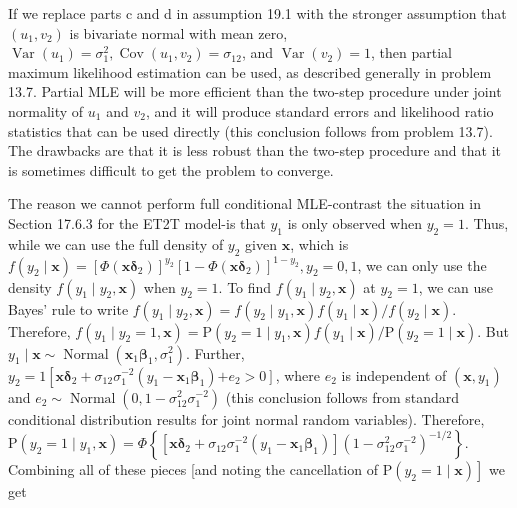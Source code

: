 \documentclass[10pt]{article}
\begin{document}
If we replace parts c and d in assumption 19.1 with the stronger assumption that $\left(u_{1}, v_{2}\right)$ is bivariate normal with mean zero, $\operatorname{Var}\left(u_{1}\right)=\sigma_{1}^{2}, \operatorname{Cov}\left(u_{1}, v_{2}\right)=\sigma_{12}$, and $\operatorname{Var}\left(v_{2}\right)=1$, then partial maximum likelihood estimation can be used, as described generally in problem 13.7. Partial MLE will be more efficient than the two-step procedure under joint normality of $u_{1}$ and $v_{2}$, and it will produce standard errors and likelihood ratio statistics that can be used directly (this conclusion follows from problem 13.7). The drawbacks are that it is less robust than the two-step procedure and that it is sometimes difficult to get the problem to converge.

The reason we cannot perform full conditional MLE-contrast the situation in Section 17.6.3 for the ET2T model-is that $y_{1}$ is only observed when $y_{2}=1$. Thus, while we can use the full density of $y_{2}$ given $\mathbf{x}$, which is $f\left(y_{2} \mid \mathbf{x}\right)= \left[\Phi\left(\mathbf{x} \boldsymbol{\delta}_{2}\right)\right]^{y_{2}}\left[1-\Phi\left(\mathbf{x} \boldsymbol{\delta}_{2}\right)\right]^{1-y_{2}}, y_{2}=0,1$, we can only use the density $f\left(y_{1} \mid y_{2}, \mathbf{x}\right)$ when $y_{2}=1$. To find $f\left(y_{1} \mid y_{2}, \mathbf{x}\right)$ at $y_{2}=1$, we can use Bayes' rule to write $f\left(y_{1} \mid y_{2}, \mathbf{x}\right)= f\left(y_{2} \mid y_{1}, \mathbf{x}\right) f\left(y_{1} \mid \mathbf{x}\right) / f\left(y_{2} \mid \mathbf{x}\right)$. Therefore, $f\left(y_{1} \mid y_{2}=1, \mathbf{x}\right)=\mathrm{P}\left(y_{2}=1 \mid y_{1}, \mathbf{x}\right) f\left(y_{1} \mid \mathbf{x}\right) / \mathrm{P}\left(y_{2}=1 \mid \mathbf{x}\right)$. But $y_{1} \mid \mathbf{x} \sim \operatorname{Normal}\left(\mathbf{x}_{1} \boldsymbol{\beta}_{1}, \sigma_{1}^{2}\right)$. Further, $y_{2}=1\left[\mathbf{x} \boldsymbol{\delta}_{2}+\sigma_{12} \sigma_{1}^{-2}\left(y_{1}-\mathbf{x}_{1} \boldsymbol{\beta}_{1}\right)\right. \left.+e_{2}>0\right]$, where $e_{2}$ is independent of $\left(\mathbf{x}, y_{1}\right)$ and $e_{2} \sim \operatorname{Normal}\left(0,1-\sigma_{12}^{2} \sigma_{1}^{-2}\right)$ (this conclusion follows from standard conditional distribution results for joint normal random variables). Therefore,\\
$\mathrm{P}\left(y_{2}=1 \mid y_{1}, \mathbf{x}\right)=\Phi\left\{\left[\mathbf{x} \boldsymbol{\delta}_{2}+\sigma_{12} \sigma_{1}^{-2}\left(y_{1}-\mathbf{x}_{1} \boldsymbol{\beta}_{1}\right)\right]\left(1-\sigma_{12}^{2} \sigma_{1}^{-2}\right)^{-1 / 2}\right\}$.\\
Combining all of these pieces [and noting the cancellation of $\left.\mathrm{P}\left(y_{2}=1 \mid \mathbf{x}\right)\right]$ we get
\end{document}
